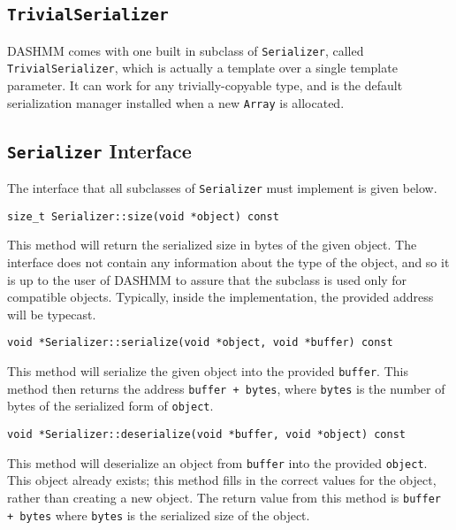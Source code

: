 \subsection{\texttt{TrivialSerializer}}

DASHMM comes with one built in subclass of \texttt{Serializer}, called
\texttt{TrivialSerializer}, which is actually a template over a single
template parameter. It can work for any trivially-copyable type, and is the
default serialization manager installed when a new \texttt{Array} is
allocated.

\subsection{\texttt{Serializer} Interface}

The interface that all subclasses of \texttt{Serializer} must implement is
given below.

\begin{lstlisting}
size_t Serializer::size(void *object) const
\end{lstlisting}

\noindent This method will return the serialized size in bytes of the given
object. The interface does not contain any information about the type of the
object, and so it is up to the user of DASHMM to assure that the subclass is
used only for compatible objects. Typically, inside the implementation, the
provided address will be typecast.

\begin{lstlisting}
void *Serializer::serialize(void *object, void *buffer) const
\end{lstlisting}

\noindent This method will serialize the given object into the provided 
\texttt{buffer}. This method then returns the address \texttt{buffer + bytes},
where \texttt{bytes} is the number of bytes of the serialized form of 
\texttt{object}.

\begin{lstlisting}
void *Serializer::deserialize(void *buffer, void *object) const
\end{lstlisting}

\noindent This method will deserialize an object from \texttt{buffer} into
the provided \texttt{object}. This object already exists; this method fills
in the correct values for the object, rather than creating a new object.
The return value from this method is \texttt{buffer + bytes} where 
\texttt{bytes} is the serialized size of the object.


